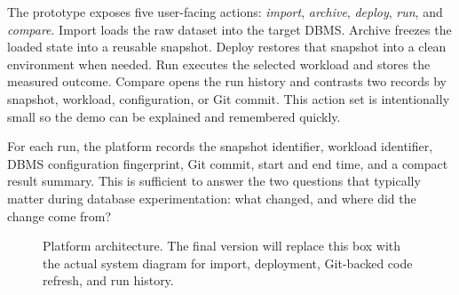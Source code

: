 \documentclass[runningheads]{llncs}
\begin{document}
The prototype exposes five user-facing actions: \emph{import}, \emph{archive}, \emph{deploy}, \emph{run}, and \emph{compare}. Import loads the raw dataset into the target DBMS. Archive freezes the loaded state into a reusable snapshot. Deploy restores that snapshot into a clean environment when needed. Run executes the selected workload and stores the measured outcome. Compare opens the run history and contrasts two records by snapshot, workload, configuration, or Git commit. This action set is intentionally small so the demo can be explained and remembered quickly.

For each run, the platform records the snapshot identifier, workload identifier, DBMS configuration fingerprint, Git commit, start and end time, and a compact result summary. This is sufficient to answer the two questions that typically matter during database experimentation: what changed, and where did the change come from?

\begin{figure}[t]
\centering
{}
\caption{Platform architecture. The final version will replace this box with the actual system diagram for import, deployment, Git-backed code refresh, and run history.}
\label{fig:arch}
\end{figure}
\end{document}
